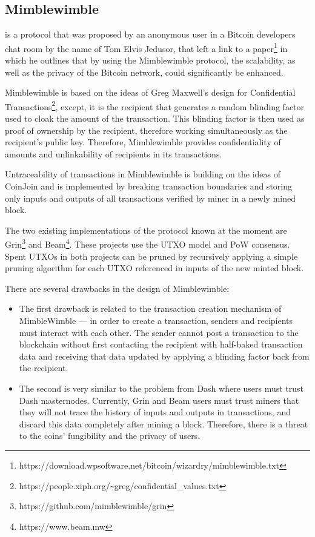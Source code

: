 \documentclass[8pt,fleqn,openany]{book}
\begin{document}
\subsection{Mimblewimble} is a protocol that was proposed by an anonymous user in a Bitcoin developers chat room by the name of Tom Elvis Jedusor, that left a link to a paper\footnote{https://download.wpsoftware.net/bitcoin/wizardry/mimblewimble.txt} in which he outlines that by using the Mimblewimble protocol, the scalability, as well as the privacy of the Bitcoin network, could significantly be enhanced.

Mimblewimble is based on the ideas of Greg Maxwell's design for Confidential Transactions\footnote{https://people.xiph.org/\texttt{\~}greg/confidential\_values.txt}, except, it is the recipient that generates a random blinding factor used to cloak the amount of the transaction. This blinding factor is then used as proof of ownership by the recipient, therefore working simultaneously as the recipient's public key. Therefore, Mimblewimble provides confidentiality of amounts and unlinkability of recipients in its transactions.

Untraceability of transactions in Mimblewimble is building on the ideas of CoinJoin and is implemented by breaking transaction boundaries and storing only inputs and outputs of all transactions verified by miner in a newly mined block.

The two existing implementations of the protocol known at the moment are Grin\footnote{https://github.com/mimblewimble/grin} and Beam\footnote{https://www.beam.mw}. These projects use the UTXO model and PoW consensus. Spent UTXOs in both projects can be pruned by recursively applying a simple pruning algorithm for each UTXO referenced in inputs of the new minted block.

There are several drawbacks in the design of Mimblewimble:

\begin{itemize}
  \item {The first drawback is related to the transaction creation mechanism of MimbleWimble --- in order to create a transaction, senders and recipients must interact with each other. The sender cannot post a transaction to the blockchain without first contacting the recipient with half-baked transaction data and receiving that data updated by applying a blinding factor back from the recipient.}
  \item {The second is very similar to the problem from Dash where users must trust Dash masternodes. Currently, Grin and Beam users must trust miners that they will not trace the history of inputs and outputs in transactions, and discard this data completely after mining a block. Therefore, there is a threat to the coins' fungibility and the privacy of users.}
\end{itemize}
\end{document}
